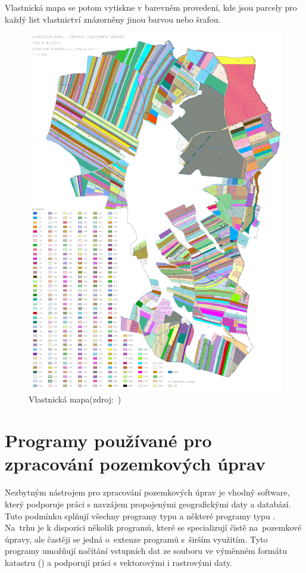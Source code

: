 Vlastnická mapa se potom vytiskne v barevném provedení, kde jsou parcely pro každý list vlastnictví znázorněny jinou barvou nebo šrafou.

	\begin{figure}[H]
		\centering
		\includegraphics[width=.8\textwidth]{./pictures/vlastnicka_mapa.pdf}
		\caption[Vlastnická mapa]{Vlastnická mapa(zdroj:~\citep{skvorec})}
		\label{fig:vlastnicka_mapa}
 	\end{figure}

\section{Programy používané pro zpracování pozemkových úprav}
\label{programy_pu}

Nezbytným nástrojem pro zpracování pozemkových úprav je vhodný software, který podporuje práci s navzájem propojenými geografickými daty a databází. Tuto podmínku splňují všechny programy typu  a některé programy typu . Na~trhu je k dispozici několik programů, které se specializují čistě na~pozemkové úpravy, ale častěji se jedná o~extenze programů s~širším využitím. Tyto programy umožňují načítání vstupních dat ze souboru ve výměnném formátu katastru () a podporují práci s vektorovými i rastrovými daty.

